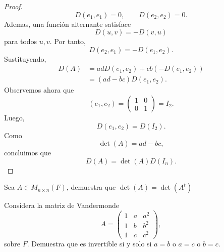 \documentclass[12pt,a4paper]{article}
\begin{document}
\begin{proof}
\begin{equation*}
            D(e_{1},e_{1})=0,\qquad D(e_{2},e_{2})=0.
        \end{equation*}
        Ademas, una función alternante satisface
        \begin{equation*}
            D(u,v)=-D(v,u)
        \end{equation*}
        para todos $u,v$. Por tanto,
        \begin{equation*}
            D(e_{2},e_{1})=-D(e_{1},e_{2}).
        \end{equation*}
        Sustituyendo,
        \begin{align*}
            D(A)&=adD(e_{1},e_{2})+cb(-D(e_{1},e_{2}))\\
            &=(ad-bc)D(e_{1},e_{2}).
        \end{align*}
        Observemos ahora que
        \begin{equation*}
            (e_{1},e_{2})=
            \begin{pmatrix}
                1 & 0\\
                0 & 1
            \end{pmatrix}
            =I_{2}.
        \end{equation*}
        Luego,
        \begin{equation*}
            D(e_{1},e_{2})=D(I_{2}).
        \end{equation*}
        Como
        \begin{equation*}
            \det(A)=ad-bc,
        \end{equation*}
        concluimos que
        \begin{equation*}
            D(A)=\det(A)D(I_{n}).
        \end{equation*}
    \end{proof}

    \begin{mdframed}[style=mdpinkbox,frametitle={Ejercicio 3}]
        Sea $A\in M_{n\times n}(F)$, demuestra que $\det(A)=\det(A^{t})$
    \end{mdframed}

    \begin{mdframed}[style=mdpinkbox,frametitle={Ejercicio 4}]
        Considera la matriz de Vandermonde
        \begin{equation*}
            A=
            \begin{pmatrix}
                1 & a & a^{2}\\
                1 & b & b^{2}\\
                1 & c & c^{2}
            \end{pmatrix},
        \end{equation*}
        sobre $F$. Demuestra que es invertible si y solo si $a=b$ o $a=c$ o $b=c$.
    \end{mdframed}
\end{document}
